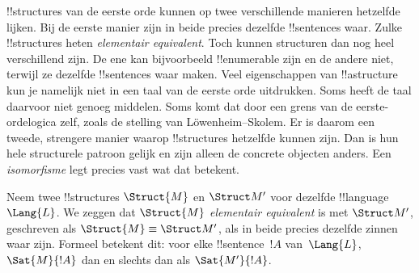 \documentclass[../../../include/open-logic-section]{subfiles}
\begin{document}

!!{structure}s van de eerste orde kunnen op twee verschillende manieren
hetzelfde lijken. Bij de eerste manier zijn in beide precies dezelfde
!!{sentence}s waar. Zulke !!{structure}s heten \emph{elementair
equivalent}. Toch kunnen structuren dan nog heel verschillend zijn. De
ene kan bijvoorbeeld !!{enumerable} zijn en de andere niet, terwijl ze
dezelfde !!{sentence}s waar maken. Veel eigenschappen van
!!a{structure} kun je namelijk niet in een taal van de eerste orde
uitdrukken. Soms heeft de taal daarvoor niet genoeg middelen. Soms komt
dat door een grens van de eerste-ordelogica zelf, zoals de stelling van
L\"owenheim--Skolem. Er is daarom een tweede, strengere manier waarop
!!{structure}s hetzelfde kunnen zijn. Dan is hun hele structurele
patroon gelijk en zijn alleen de concrete objecten anders. Een
\emph{isomorfisme} legt precies vast wat dat betekent.

\begin{defn}
Neem twee !!{structure}s $\Struct{M}$ en $\Struct M'$ voor dezelfde
!!{language}~$\Lang{L}$. We zeggen dat $\Struct{M}$ \emph{elementair
equivalent} is met $\Struct M'$, geschreven als $\Struct{M} \equiv
\Struct M'$, als in beide precies dezelfde zinnen waar zijn. Formeel
betekent dit: voor elke !!{sentence}~$!A$ van~$\Lang{L}$,
$\Sat{M}{!A}$ dan en slechts dan als $\Sat{M'}{!A}$.
\end{defn}
\end{document}
